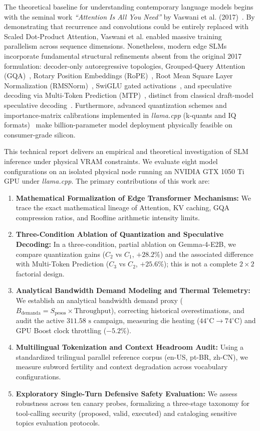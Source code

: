 \documentclass[10pt,a4paper,twocolumn]{article}
\begin{document}
The theoretical baseline for understanding contemporary language models begins with the seminal work \emph{``Attention Is All You Need''} by Vaswani et al. (2017)~\cite{vaswani2017}. By demonstrating that recurrence and convolutions could be entirely replaced with Scaled Dot-Product Attention, Vaswani et al. enabled massive training parallelism across sequence dimensions. Nonetheless, modern edge SLMs incorporate fundamental structural refinements absent from the original 2017 formulation: decoder-only autoregressive topologies, Grouped-Query Attention (GQA)~\cite{ainslie2023}, Rotary Position Embeddings (RoPE)~\cite{su2024}, Root Mean Square Layer Normalization (RMSNorm)~\cite{zhang2019}, SwiGLU gated activations~\cite{shazeer2020}, and speculative decoding via Multi-Token Prediction (MTP)~\cite{gloeckle2024mtp}, distinct from classical draft-model speculative decoding~\cite{leviathan2023}. Furthermore, advanced quantization schemes and importance-matrix calibrations implemented in \emph{llama.cpp} (k-quants and IQ formats)~\cite{gerganov2023llamacpp,dettmers2022} make billion-parameter model deployment physically feasible on consumer-grade silicon.

This technical report delivers an empirical and theoretical investigation of SLM inference under physical VRAM constraints. We evaluate eight model configurations on an isolated physical node running an NVIDIA GTX 1050 Ti GPU under \emph{llama.cpp}. The primary contributions of this work are:
\begin{enumerate}[leftmargin=1.5em,itemsep=0.2em]
    \item \textbf{Mathematical Formalization of Edge Transformer Mechanisms:} We trace the exact mathematical lineage of Attention, KV caching, GQA compression ratios, and Roofline arithmetic intensity limits.
    \item \textbf{Three-Condition Ablation of Quantization and Speculative Decoding:} In a three-condition, partial ablation on Gemma-4-E2B, we compare quantization gains ($C_2$ vs $C_1$, $+28.2\%$) and the associated difference with Multi-Token Prediction ($C_3$ vs $C_2$, $+25.6\%$); this is not a complete $2 \times 2$ factorial design.
    \item \textbf{Analytical Bandwidth Demand Modeling and Thermal Telemetry:} We establish an analytical bandwidth demand proxy ($B_{\text{demanda}} = S_{\text{pesos}} \times \text{Throughput}$), correcting historical overestimations, and audit the active $311.58\text{ s}$ campaign, measuring die heating ($44^\circ\text{C} \to 74^\circ\text{C}$) and GPU Boost clock throttling ($-5.2\%$).
    \item \textbf{Multilingual Tokenization and Context Headroom Audit:} Using a standardized trilingual parallel reference corpus (en-US, pt-BR, zh-CN), we measure subword fertility and context degradation across vocabulary configurations.
    \item \textbf{Exploratory Single-Turn Defensive Safety Evaluation:} We assess robustness across ten canary probes, formalizing a three-stage taxonomy for tool-calling security (proposed, valid, executed) and cataloging sensitive topics evaluation protocols.
\end{enumerate}
\end{document}
